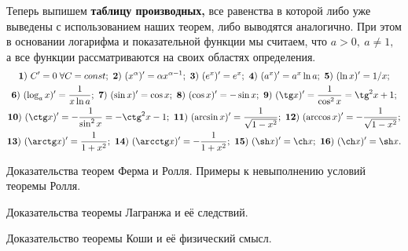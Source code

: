 Теперь выпишем \textbf{таблицу производных,}
все равенства в которой либо уже выведены
с использованием наших теорем, либо
выводятся аналогично. При этом в основании
логарифма и показательной функции мы считаем,
что $a>0, \ a\neq1,$ а все функции рассматриваются
на своих областях определения.
\begin{multline*}
{\bf 1)} \ C'=0\;\forall C=const; \ {\bf 2)} \ (x^{\alpha})'=
\alpha x^{\alpha-1}; \ {\bf 3)} \ (e^x)'=e^x; \ {\bf 4)} \ (a^x)'=
a^x\ln a; \ {\bf 5)} \ (\ln x)'=1/x;\\
{\bf 6)} \ (\log_a x)'=
\frac{1}{x\ln a}; \ {\bf 7)} \ (\sin x)'=\cos x; \
{\bf 8)} \ (\cos x)'=-\sin x; \ {\bf 9)} \ (\tg x)'=
\frac{1}{\cos^2x}=\tg^2x+1;\\
{\bf 10)} \ (\ctg x)'=-\frac{1}{\sin^2x}=-\ctg^2x-1; \
{\bf 11)} \ (\arcsin x)'=\frac{1}{\sqrt{1-x^2}}; \
{\bf 12)} \ (\arccos x)'=-\frac{1}{\sqrt{1-x^2}};\\
{\bf 13)} \ (\arctg x)'=\frac{1}{1+x^2}; \
{\bf 14)} \ (\arcctg x)'=-\frac{1}{1+x^2}; \
{\bf 15)} \ (\sh x)'=\ch x; \
{\bf 16)} \ (\ch x)'=\sh x.
\end{multline*}
\newpage

\begin{problem}
Доказательства теорем Ферма и Ролля. Примеры к невыполнению условий теоремы
Ролля.
\end{problem}
\newpage

\begin{problem}
Доказательства теоремы Лагранжа и её следствий.
\end{problem}
\newpage

\begin{problem}
Доказательство теоремы Коши и её физический смысл.
\end{problem}
\newpage
